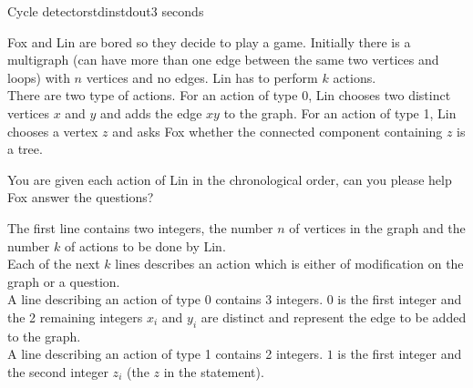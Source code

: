 \begin{problem}{Cycle detector}{stdin}{stdout}{3 seconds}


%

Fox and Lin are bored so they decide to play a game.
Initially there is a multigraph (can have more than one edge between the same two vertices and loops) with $n$ vertices and no edges.
Lin has to perform $k$ actions. \\ 
There are two type of actions.
For an action of type 0, Lin chooses two distinct vertices $x$ and $y$ and adds the edge $xy$ to the graph.
For an action of type 1, Lin chooses a vertex $z$ and asks Fox whether the connected component containing $z$ is a tree.

You are given each action of Lin in the chronological order, can you please help Fox answer the questions?


\InputFile

The first line contains two integers, the number $n$ of vertices in the graph and the number $k$ of actions to be done by Lin.\\
Each of the next $k$ lines describes an action which is either of modification on the graph or a question.\\ 
A line describing an action of type 0 contains 3 integers. $0$ is the first integer and the 2 remaining integers $x_i$ and $y_i$ are distinct and represent the edge to be added to the graph.\\ 
A line describing an action of type 1 contains 2 integers. $1$ is the first integer and the second integer $z_i$ (the $z$ in the statement).


\end{problem}
